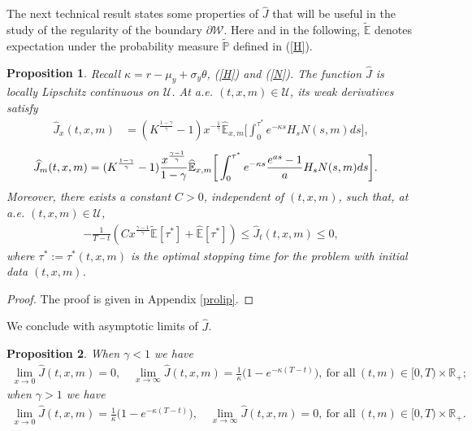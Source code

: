 \documentclass[a4paper,11pt]{amsart}
\numberwithin{equation}{section}
\newtheorem{pro}{Proposition}[section]
\newcommand{\blue}[1]{{\color{black}#1}}
\begin{document}
{The next technical result states some properties of $\widehat{J}$ that will be useful in the study of the regularity of the boundary $\partial \mathcal{W}$. {Here and in the following, $\widetilde{\mathbb E}$ denotes expectation under the probability measure $\widetilde{\mathbb P}$ defined in (\ref{H}).} 
\begin{pro}\label{lip}
Recall $\kappa=r-\mu_y+\sigma_y\theta$, (\ref{H}) and (\ref{N}). {The function $\widehat J$ is locally Lipschitz continuous on $\mathcal U$. At a.e. $(t,x,m)\in\mathcal U$, its weak derivatives satisfy}
\begin{align}\label{lipx}
\widehat{J}_x(t,x,m) &= (K^{\frac{1-\gamma}{\gamma}}-1) x^{-\frac{1}{\gamma}} \widehat{\mathbb{E}}_{x,m}\bigg[    \int_0^{\tau^\ast }  e^{-\kappa s}H_s N(s,m)ds \bigg],
\end{align}
\begin{align}\label{lipm}
\widehat{J}_m(t,x,m)&=  \blue{(K^{\frac{1-\gamma}{\gamma}}-1) \frac{x^{\frac{\gamma-1}{\gamma}}}{1-\gamma}\widehat{\mathbb{E}}_{x,m}\bigg[\int_0^{\tau^\ast}e^{-\kappa s}\frac{e^{as}-1}{a}H_sN(s,m)ds\bigg].}
\end{align}
{Moreover, there exists a constant $C>0$, independent of $(t,x,m)$, such that, at a.e. $(t,x,m)\in\mathcal U$,}
\begin{align}\label{lipt}
-\frac{1}{T-t}( C x^{\frac{\gamma-1}{\gamma}}	\widetilde{\mathbb{E}}[\tau^\ast]+	\widehat{\mathbb{E}}[\tau^\ast]) \leq \widehat{J}_t(t,x,m) \leq 0,
\end{align}
where $\tau^\ast:=\tau^\ast(t, x, m)$ is the optimal stopping time for the problem with initial data $(t, x, m)$. 
\end{pro}
\begin{proof}
The proof is given in Appendix \ref{prolip}.


\end{proof}

We conclude with asymptotic limits of $\widehat{J}$.
\begin{pro}\label{limit}
	When $\gamma<1$ we have
	\begin{align*}
		\lim_{x \to 0}\widehat{J}(t,x,m) =0, \quad \lim_{x\to \infty}\widehat{J}(t,x,m)=\frac{1}{\kappa}\Big(1-e^{-\kappa(T-t)}\Big), \ \text{for all} \ (t,m)\in [0,T) \times \mathbb{R}_+;
		\end{align*}  
		 when $\gamma>1$ we have 
		\begin{align*}
			\lim_{x \to 0}\widehat{J}(t,x,m)=\frac{1}{\kappa}\Big(1-e^{-\kappa(T-t)}\Big), \quad \lim_{x \to \infty}\widehat{J}(t,x,m)=0, \ \text{for all} \ (t,m)\in [0,T) \times \mathbb{R}_+.
					\end{align*}
	\end{pro}

}
\end{document}
